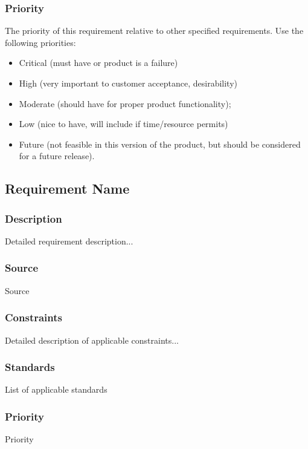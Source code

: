 \subsubsection{Priority}
The priority of this requirement relative to other specified requirements. Use the following priorities:
\begin{itemize}
\item Critical (must have or product is a failure)
\item High (very important to customer acceptance, desirability)
\item Moderate (should have for proper product functionality);
\item Low (nice to have, will include if time/resource permits)
\item Future (not feasible in this version of the product, but should be considered for a future release).
\end{itemize}

\subsection{Requirement Name}
\subsubsection{Description}
Detailed requirement description...
\subsubsection{Source}
Source
\subsubsection{Constraints}
Detailed description of applicable constraints...
\subsubsection{Standards}
List of applicable standards
\subsubsection{Priority}
Priority
